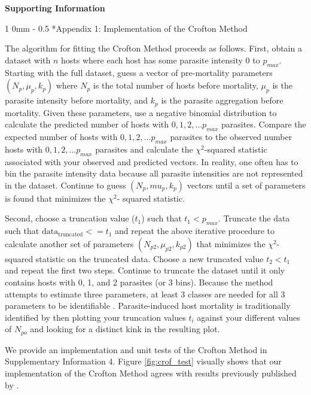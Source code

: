 \documentclass[12pt, a4paper]{article}
\makeatletter
\renewcommand{\section}{\@startsection
{section}%
{1}%
{0mm}%
{-\baselineskip}%
{0.5\baselineskip}%
{\normalfont\bf\large}} %
\makeatother
\begin{document}
\linenumbers

\doublespacing

\noindent
\Large{\textbf{Supporting Information}}

\normalsize

\section*{Appendix 1: Implementation of the Crofton Method}

The algorithm for fitting the Crofton Method \citep{Crofton1971a} proceeds as follows. First, obtain a dataset
with $n$ hosts where each host has some parasite intensity 0 to $p_{max}$. Starting
with the full dataset, guess a vector of pre-mortality parameters $(N_p, \mu_p, k_p)$ where $N_p$ is the total number of hosts before mortality, $\mu_p$ is the parasite intensity before mortality, and $k_p$ is the parasite aggregation before mortality. Given
these parameters, use a negative binomial distribution to calculate the predicted number of hosts with $0, 1, 2, \dots
p_{max}$ parasites.  Compare the expected number of hosts with $0, 1, 2, \dots  p_{max}$ parasites
to the observed number hosts with $0, 1, 2, \dots p_{max}$ parasites and calculate
the $\chi^2$-squared statistic associated with your observed and predicted vectors. In reality, one often has to bin the parasite intensity data because all
parasite intensities are not represented in the dataset. Continue to guess $(N_p,
mu_p, k_p)$ vectors until a set of parameters is found that minimizes the $\chi^2$-
squared statistic.

Second, choose a truncation value ($t_1$) such that $t_1 <
p_{max}$. Truncate the data such that $\text{data}_\text{truncated} <= t_1$ and repeat the above
iterative procedure to calculate another set of parameters $(N_{p2}, \mu_{p2}, k_{p2})$
that minimizes the $\chi^2$-squared statistic on the truncated data. Choose a new
truncated value $t_2 < t_1$ and repeat the first two steps. Continue to truncate
the dataset until it only contains hosts with 0, 1, and 2 parasites (or 3 bins).
Because the method attempts to estimate three parameters, at least 3 classes are
needed for all 3 parameters to be identifiable \citep{Royce1990}.  Parasite-induced host mortality is traditionally identified by then plotting your truncation values $t_i$ against your different values of $N_{po}$ and looking for a distinct kink in the resulting plot.

We provide an implementation and unit tests of the Crofton Method in  Supplementary Information 4.  Figure \ref{fig:crof_test} visually shows that our implementation of the Crofton Method agrees with results previously published by \cite{Crofton1971a}.
\end{document}
